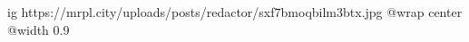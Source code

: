  
 
 
 
 

\ifcmt
  ig https://mrpl.city/uploads/posts/redactor/sxf7bmoqbilm3btx.jpg
  @wrap center
  @width 0.9
\fi
